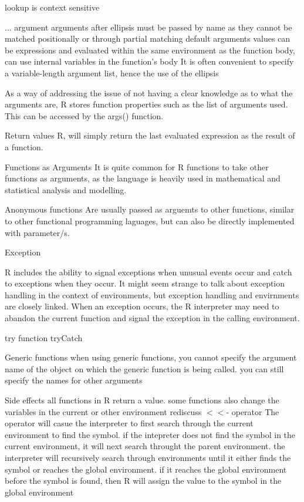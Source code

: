 \documentclass[12pt]{article}
\begin{document}
lookup is context sensitive

... argument
arguments after ellipsis must be passed by name as they cannot be matched positionally or through partial matching
default arguments values can be expressions and evaluated within the same environment as the function body, can use internal variables in the function's body
It is often convenient to specify a variable-length argument list, hence the use of the ellipsis

As a way of addressing the issue of not having a clear knowledge as to what the arguments are, R stores function properties such as the list of arguments used. This can be accessed by the args() function.

Return values
R, will simply return the last evaluated expression as the result of a function.

Functions as Arguments
It is quite common for R functions to take other functions as arguments, as the language is heavily used in mathematical and statistical analysis and modelling.

Anonymous functions
Are usually passed as arguemts to other functions, similar to other functional programming laguages, but can also be directly implemented with parameter/s.




Exception

R includes the ability to signal exceptions when unusual events occur and catch to exceptions when they occur. It might seem strange to talk about exception handling in the context of environments, but exception handling and envirnments are closely linked. When an exception occurs, the R interpreter may need to abandon the current function and signal the exception in the calling environment.

try function
tryCatch

Generic functions
when using generic functions, you cannot specify the argument name of the object on which the generic function is being called. you can still specify the names for other arguments


Side effects
all functions in R return a value. some functions also change the variables in the current or other environment
rediscuss \(<<\)- operator
The operator will casue the interpreter to first search through the current environment to find the symbol. if the intepreter does not find the symbol in the current environment, it will next search throught the parent environment. the interpreter will recursively search through environments until it either finds the symbol or reaches the global environment. if it reaches the global environment before the symbol is found, then R will assign the value to the symbol in the global environment
\end{document}
